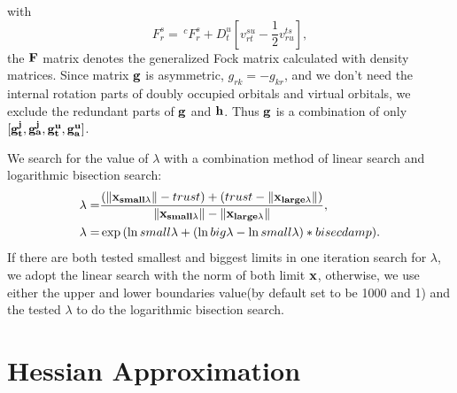 \documentclass[a4paper,12pt,oneside]{book}
\newcommand{\pre}[1]{\,#1\!}
\begin{document}
with
\begin{equation}
  F_r^s = \pre{^c}F_r^s + D_t^u[v^{su}_{rt}-\frac{1}{2}v^{ts}_{ru}],
\end{equation}
the $\bf{F}$ matrix denotes the generalized Fock matrix calculated with density matrices.
Since matrix $\bf{g}$ is asymmetric, $g_{rk}=-g_{kr}$, and we don't need the internal rotation parts of doubly occupied orbitals and virtual orbitals,
we exclude the redundant parts of $\bf{g}$ and $\bf{h}$. 
 Thus $\bf{g}$ is a combination of only $[\bf{g}_t^j,\bf{g}_a^j,\bf{g}_t^u, \bf{g}_a^u ]$.

We search for the value of $\lambda$ with a combination method of linear search and logarithmic bisection search:
\begin{equation}
\begin{aligned}
  \lambda =&\frac{(\left\lVert\bf{x_{small\lambda}}\right\rVert - trust) + (trust -\left\lVert\bf{x_{large\lambda}}\right\rVert)}{\left\lVert\bf{x_{small\lambda}}\right\rVert-\left\lVert\bf{x_{large\lambda}}\right\rVert},\\
  \lambda=&\exp{(\ln{small\lambda}+(\ln{big\lambda}-\ln{small\lambda}) * bisecdamp)}.
\end{aligned}
\end{equation}
If there are both tested smallest and biggest limits in one iteration search for $\lambda$, we adopt the linear search with the norm of both limit $\bf{x}$,
otherwise, we use either the upper and lower boundaries value(by default set to be 1000 and 1) and the tested $\lambda$ to do the logarithmic bisection search.


\section{Hessian Approximation}
\end{document}
